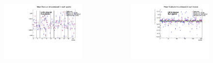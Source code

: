 \documentclass[aspectratio=1610, 12pt]{beamer}
\begin{document}
\begin{frame}
  \begin{columns}
    \begin{column}[c]{0.48\textwidth}
      \begin{figure}
        \includegraphics[width=\textwidth]{plots/compi/RMSResidualQuarterscomp_choice.pdf}
      \end{figure}
    \end{column}
    \begin{column}[c]{0.48\textwidth}
      \begin{figure}
        \includegraphics[width=\textwidth]{plots/compi/RMSResidualModulescomp_choice.pdf}
      \end{figure}
    \end{column}
  \end{columns}
\end{frame}
\end{document}
